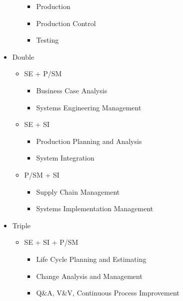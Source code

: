 \documentclass[letterpaper,10pt,english]{jupyterBook}
\begin{document}
\begin{itemize}
\begin{itemize}
\begin{itemize}
\item {} 
\sphinxAtStartPar
Production

\item {} 
\sphinxAtStartPar
Production Control

\item {} 
\sphinxAtStartPar
Testing

\end{itemize}

\end{itemize}

\item {} 
\sphinxAtStartPar
Double
\begin{itemize}
\item {} 
\sphinxAtStartPar
SE + P/SM
\begin{itemize}
\item {} 
\sphinxAtStartPar
Business Case Analysis

\item {} 
\sphinxAtStartPar
Systems Engineering Management

\end{itemize}

\item {} 
\sphinxAtStartPar
SE + SI
\begin{itemize}
\item {} 
\sphinxAtStartPar
Production Planning and Analysis

\item {} 
\sphinxAtStartPar
System Integration

\end{itemize}

\item {} 
\sphinxAtStartPar
P/SM + SI
\begin{itemize}
\item {} 
\sphinxAtStartPar
Supply Chain Management

\item {} 
\sphinxAtStartPar
Systems Implementation Management

\end{itemize}

\end{itemize}

\item {} 
\sphinxAtStartPar
Triple
\begin{itemize}
\item {} 
\sphinxAtStartPar
SE + SI + P/SM
\begin{itemize}
\item {} 
\sphinxAtStartPar
Life Cycle Planning and Estimating

\item {} 
\sphinxAtStartPar
Change Analysis and Management

\item {} 
\sphinxAtStartPar
Q\&A, V\&V, Continuous Process Improvement

\end{itemize}

\end{itemize}

\end{itemize}
\end{document}
